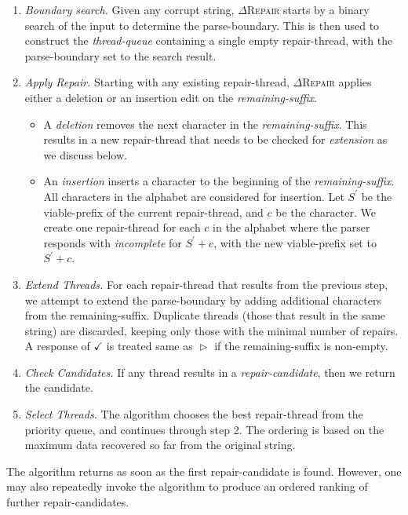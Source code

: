 \documentclass[acmsmall,screen,review,anonymous]{acmart}
\def\Rincomplete{\texttt{\color{incompletecolor}\textbf{$\vartriangleright$}}\xspace}
\def\Rvalid{\texttt{\color{validcolor}\textbf{$\checkmark$}}\xspace}
\newcommand{\approach}{\textsc{$\Delta$Repair}\xspace}
\newcommand{\drepair}{\approach}
\begin{document}
\begin{enumerate}
\item \emph{Boundary search.} Given any corrupt string, \drepair starts by a
binary search of the input to determine the parse-boundary. This is then used
to construct the \emph{thread-queue} containing a single empty repair-thread,
with the parse-boundary set to the search result.

\item \emph{Apply Repair.} Starting with any existing repair-thread, \drepair applies
either a deletion or an insertion edit on the \emph{remaining-suffix}.
\begin{itemize}
\item A \emph{deletion} removes the next character in the \emph{remaining-suffix}.
This results in a new repair-thread that needs to be checked for \emph{extension} as we discuss below.
\item An \emph{insertion} inserts a character to the beginning of the \emph{remaining-suffix}.
All characters in the alphabet are considered for insertion.
Let $S^{'}$ be the viable-prefix of the current repair-thread, and $c$ be the character.
We create one repair-thread for each $c$ in the alphabet where the parser
responds with \emph{incomplete} for $S^{'}+c$, with the new viable-prefix set to $S^{'}+c$.
\end{itemize}
\item \emph{Extend Threads.} For each repair-thread that results from the previous step,
we attempt to extend the parse-boundary by adding additional characters from the
remaining-suffix. Duplicate threads (those that result in the same string) are discarded,
keeping only those with the minimal number of repairs. A response of \Rvalid is
treated same as \Rincomplete if the remaining-suffix is non-empty.
\item \emph{Check Candidates.} If any thread results in a
\emph{repair-candidate}, then we return the candidate.
\item \emph{Select Threads.} The algorithm chooses the best repair-thread from the priority queue,
and continues through step 2. The ordering is based on the maximum data recovered so far from the original string.
\end{enumerate}

The algorithm returns as soon as the first repair-candidate is found.
However, one may also repeatedly invoke the algorithm to produce an ordered
ranking of further repair-candidates.
\end{document}
